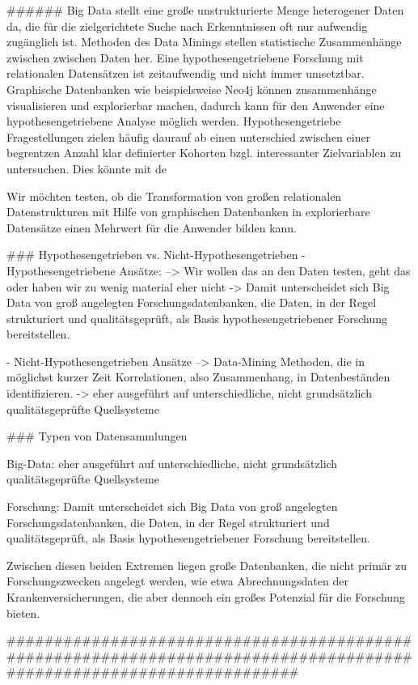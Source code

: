 ######
Big Data stellt eine große unstrukturierte Menge heterogener Daten da, die für die zielgerichtete Suche nach Erkenntnissen oft nur aufwendig zugänglich ist. Methoden des Data Minings stellen statistische Zusammenhänge zwischen zwischen Daten her. Eine hypothesengetriebene Forschung mit relationalen Datensätzen ist zeitaufwendig und nicht immer umsetztbar. Graphische Datenbanken wie beispielsweise Neo4j können zusammenhänge visualisieren und explorierbar machen, dadurch kann für den Anwender eine hypothesengetriebene Analyse möglich werden. Hypothesengetriebe Fragestellungen zielen häufig daurauf ab einen unterschied zwischen einer begrentzen Anzahl klar definierter Kohorten bzgl. interessanter Zielvariablen zu untersuchen. Dies könnte mit de

Wir möchten testen, ob die Transformation von großen relationalen Datenstrukturen mit Hilfe von graphischen Datenbanken in explorierbare Datensätze einen Mehrwert für die Anwender bilden kann. 




### Hypothesengetrieben vs. Nicht-Hypothesengetrieben
-  Hypothesengetriebene Ansätze: --> Wir wollen das an den Daten testen, geht das oder haben wir zu wenig material eher nicht -> Damit unterscheidet sich Big Data von groß angelegten Forschungsdatenbanken, die Daten, in der Regel strukturiert und qualitätsgeprüft, als Basis hypothesengetriebener Forschung bereitstellen.

- Nicht-Hypothesengetrieben Ansätze --> Data-Mining Methoden, die in möglichst kurzer Zeit Korrelationen, also Zusammenhang, in Datenbeständen identifizieren. -> eher ausgeführt auf unterschiedliche, nicht grundsätzlich qualitätsgeprüfte Quellsysteme


### Typen von Datensammlungen

Big-Data: eher ausgeführt auf unterschiedliche, nicht grundsätzlich qualitätsgeprüfte Quellsysteme

Forschung: Damit unterscheidet sich Big Data von groß angelegten Forschungsdatenbanken, die Daten, in der Regel strukturiert und qualitätsgeprüft, als Basis hypothesengetriebener Forschung bereitstellen.

Zwischen diesen beiden Extremen liegen große Datenbanken, die nicht primär zu Forschungszwecken angelegt werden, wie etwa Abrechnungsdaten der Krankenversicherungen, die aber dennoch ein großes Potenzial für die Forschung bieten.

#####################################################################################################################
\
